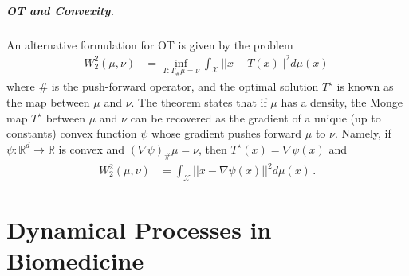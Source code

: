 \paragraph{OT and Convexity.} 
An alternative formulation for OT is given by the \citet{monge1781histoire} problem  
\begin{align}\label{eq:monge}
W_2^2(\mu,\nu) &= \inf_{T:T_{\#} \mu = \nu} \int_\mathcal{X} ||x - T(x)||^2d\mu(x) \,
\end{align}
where $\#$ is the push-forward operator, and the optimal solution $T^\star$ is known as the \citeauthor{monge1781histoire} map between $\mu$ and $\nu$. The \citeauthor{Brenier1987} theorem \citeyear{Brenier1987} states that if $\mu$ has a density, the Monge map $T^\star$ between $\mu$ and $\nu$ can be recovered as the gradient of a unique (up to constants) convex function $\psi$ whose gradient pushes forward $\mu$ to $\nu$. Namely, if $\psi:\mathbb{R}^d \rightarrow \mathbb{R}$ is convex and $(\nabla \psi)_{\#}\mu = \nu$, then $T^\star(x)=\nabla \psi(x)$ and
\begin{align}\label{eq:brenier}
W_2^2(\mu,\nu) &= \int_\mathcal{X} ||x - \nabla \psi(x)||^2 d\mu(x)\,.
\end{align}



\chapter{Dynamical Processes in Biomedicine}
\label{cha:bio_background}

%
